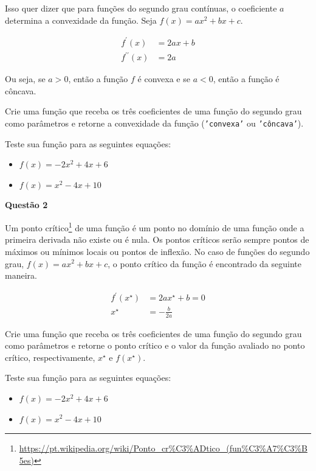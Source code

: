 \documentclass[12pt, a4paper]{article}
\begin{document}
Isso quer dizer que para funções do segundo grau contínuas, o coeficiente $a$ determina a convexidade da função. Seja $f(x) = ax^2 + bx + c$.

\begin{align*}
	f^{\prime} (x) &= 2ax + b \\
	f^{\prime \prime} (x) &= 2a
\end{align*}

Ou seja, se $a > 0$, então a função $f$ é convexa e se $a < 0$, então a função é côncava.

Crie uma função que receba os três coeficientes de uma função do segundo grau como parâmetros e retorne a convexidade da função (\texttt{'convexa'} ou \texttt{'côncava'}).

Teste sua função para as seguintes equações:

\begin{itemize}
	\item $f(x) = -2x^2 + 4x + 6$
	\item $f(x) = x^2 - 4x + 10$
\end{itemize}



\textbf{Questão 2}

Um ponto crítico\footnote{\url{https://pt.wikipedia.org/wiki/Ponto\_cr\%C3\%ADtico\_(fun\%C3\%A7\%C3\%B5es)}}
 de uma função é um ponto no domínio de uma função onde a primeira derivada não existe ou é nula. Os pontos críticos serão sempre pontos de máximos ou mínimos locais ou pontos de inflexão.
No caso de funções do segundo grau, $f(x) = ax^2 + bx + c$, o ponto crítico da função é encontrado da seguinte maneira.

\begin{align*}
	f^{\prime} (x^{\star}) &= 2ax^{\star} + b = 0\\
		x^{\star} &= -\frac{b}{2a}
\end{align*}


Crie uma função que receba os três coeficientes de uma função do segundo grau como parâmetros e retorne o ponto crítico e o valor da função avaliado no ponto crítico, respectivamente, $x^{\star}$ e $f (x^{\star})$.

Teste sua função para as seguintes equações:

\begin{itemize}
	\item $f(x) = -2x^2 + 4x + 6$
	\item $f(x) = x^2 - 4x + 10$
\end{itemize}
\end{document}
